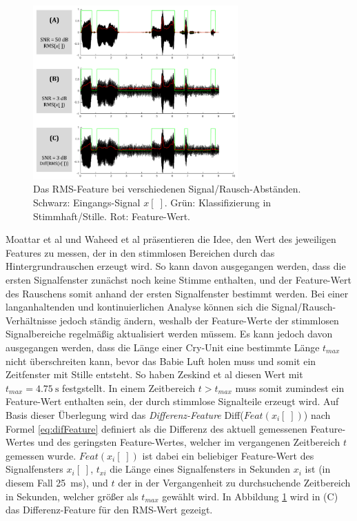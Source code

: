 \begin{figure}[h]
	\centering
	\includegraphics[width=0.7\textwidth]{bilder/rms_diff.png}
	\caption{Das RMS-Feature bei verschiedenen Signal/Rausch-Abständen. Schwarz: Eingangs-Signal $x[\;]$. Grün: Klassifizierung in Stimmhaft/Stille. Rot: Feature-Wert.}
	\label{img:min-signal}
\end{figure}

Moattar et al \cite{vad_Easy} und Waheed et al \cite{vad_entropy} präsentieren die Idee, den Wert des jeweiligen Features zu messen, der in den stimmlosen Bereichen durch das Hintergrundrauschen erzeugt wird. So kann davon ausgegangen werden, dass die ersten Signalfenster zunächst noch keine Stimme enthalten, und der Feature-Wert des Rauschens somit anhand der ersten Signalfenster bestimmt werden. Bei einer langanhaltenden und kontinuierlichen Analyse können sich die Signal/Rausch-Verhältnisse jedoch ständig ändern, weshalb der Feature-Werte der stimmlosen Signalbereiche regelmäßig aktualisiert werden müssem. Es kann jedoch davon ausgegangen werden, dass die Länge einer Cry-Unit eine bestimmte Länge $t_{max}$ nicht überschreiten kann, bevor das Babie Luft holen muss und somit ein Zeitfenster mit Stille entsteht. So haben Zeskind et al \cite{rythmic} diesen Wert mit $t_{max} = \SI{4.75}{\second}$ festgstellt. In einem Zeitbereich $ t > t_{max}$ muss somit zumindest ein Feature-Wert enthalten sein, der durch stimmlose Signalteile erzeugt wird. Auf Basis dieser Überlegung wird das \emph{Differenz-Feature} Diff($Feat(x_i[\;])$) nach Formel \ref{eq:difFeature} definiert als die Differenz des aktuell gemessenen Feature-Wertes und des geringsten Feature-Wertes, welcher im vergangenen Zeitbereich $t$ gemessen wurde. $Feat(x_i[\;])$ ist dabei ein beliebiger Feature-Wert des Signalfensters $x_i[\;]$, $t_{xi}$ die Länge eines Signalfensters in Sekunden $x_i$ ist (in diesem Fall \SI{25}{\milli\second}), und $t$ der in der Vergangenheit zu durchsuchende Zeitbereich in Sekunden, welcher größer als $t_{max}$ gewählt wird. In Abbildung \ref{img:min-signal} wird in (C) das Differenz-Feature für den RMS-Wert gezeigt.

